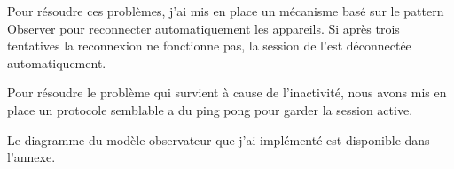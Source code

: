 Pour résoudre ces problèmes, j'ai mis en place un mécanisme basé sur le pattern Observer pour reconnecter automatiquement les appareils. Si après trois tentatives la reconnexion ne fonctionne pas, la session de l'\ut est déconnectée automatiquement.

Pour résoudre le problème qui survient à cause de l'inactivité, nous avons mis en place un protocole semblable a du ping pong pour garder la session active.

Le diagramme du modèle observateur que j'ai implémenté est disponible dans l'annexe.